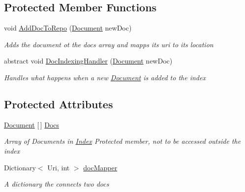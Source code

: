 \subsection*{Protected Member Functions}
\begin{DoxyCompactItemize}
\item 
void \hyperlink{classdot_net_i_r_1_1_base_indexing_1_1_index_a519531283425656fe695295b6ec8ca92}{Add\+Doc\+To\+Repo} (\hyperlink{classdot_net_i_r_1_1_base_indexing_1_1_document}{Document} new\+Doc)
\begin{DoxyCompactList}\small\item\em Adds the document ot the docs array and mapps its uri to its location \end{DoxyCompactList}\item 
abstract void \hyperlink{classdot_net_i_r_1_1_base_indexing_1_1_index_a0542ffc547b7cc72f4615c763589ba3c}{Doc\+Indexing\+Handler} (\hyperlink{classdot_net_i_r_1_1_base_indexing_1_1_document}{Document} new\+Doc)
\begin{DoxyCompactList}\small\item\em Handles what happens when a new \hyperlink{classdot_net_i_r_1_1_base_indexing_1_1_document}{Document} is added to the index \end{DoxyCompactList}\end{DoxyCompactItemize}
\subsection*{Protected Attributes}
\begin{DoxyCompactItemize}
\item 
\hyperlink{classdot_net_i_r_1_1_base_indexing_1_1_document}{Document} \mbox{[}$\,$\mbox{]} \hyperlink{classdot_net_i_r_1_1_base_indexing_1_1_index_a3d39c5f32ca9bc6bc076ebcbc72b9923}{Docs}
\begin{DoxyCompactList}\small\item\em Array of Documents in \hyperlink{classdot_net_i_r_1_1_base_indexing_1_1_index}{Index} Protected member, not to be accessed outside the index \end{DoxyCompactList}\item 
Dictionary$<$ Uri, int $>$ \hyperlink{classdot_net_i_r_1_1_base_indexing_1_1_index_a35e48f0af6a704545fa171622c8739b9}{doc\+Mapper}
\begin{DoxyCompactList}\small\item\em A dictionary the connects two docs \end{DoxyCompactList}\end{DoxyCompactItemize}
